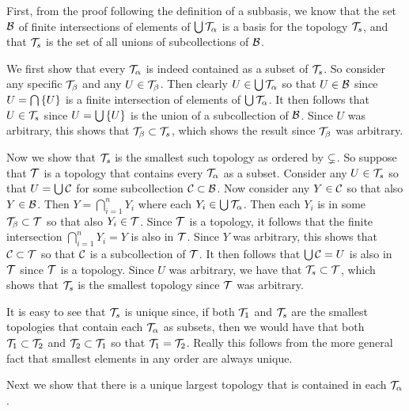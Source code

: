 {{    First, from the proof following the definition of a subbasis, we know that the set $\mathcal{B}$ of finite intersections of elements of $\bigcup \mathcal{T}_\alpha$ is a basis for the topology $\mathcal{T}_s$, and that $\mathcal{T}_s$ is the set of all unions of subcollections of $\mathcal{B}$.

    We first show that every $\mathcal{T}_\alpha$ is indeed contained as a subset of $\mathcal{T}_s$.
    So consider any specific $\mathcal{T}_\beta$ and any $U \in \mathcal{T}_\beta$.
    Then clearly $U \in \bigcup \mathcal{T}_\alpha$ so that $U \in \mathcal{B}$ since $U = \bigcap \left\{ U \right\}$ is a finite intersection of elements of $\bigcup \mathcal{T}_\alpha$.
    It then follows that $U \in \mathcal{T}_s$ since $U = \bigcup \left\{ U \right\}$ is the union of a subcollection of $\mathcal{B}$.
    Since $U$ was arbitrary, this shows that $\mathcal{T}_\beta \subset \mathcal{T}_s$, which shows the result since $\mathcal{T}_\beta$ was arbitrary.

    Now we show that $\mathcal{T}_s$ is the smallest such topology as ordered by $\subsetneq$.
    So suppose that $\mathcal{T}$ is a topology that contains every $\mathcal{T}_\alpha$ as a subset.
    Consider any $U \in \mathcal{T}_s$ so that $U = \bigcup \mathcal{C}$ for some subcollection $\mathcal{C} \subset \mathcal{B}$.
    Now consider any $Y \in \mathcal{C}$ so that also $Y \in \mathcal{B}$.
    Then $Y = \bigcap_{i=1}^n Y_i$ where each $Y_i \in \bigcup \mathcal{T}_\alpha$.
    Then each $Y_i$ is in some $\mathcal{T}_\beta \subset \mathcal{T}$ so that also $Y_i \in \mathcal{T}$.
    Since $\mathcal{T}$ is a topology, it follows that the finite intersection $\bigcap_{i=1}^n Y_i = Y$ is also in $\mathcal{T}$.
    Since $Y$ was arbitrary, this shows that $\mathcal{C} \subset \mathcal{T}$ so that $\mathcal{C}$ is a subcollection of $\mathcal{T}$.
    It then follows that $\bigcup \mathcal{C} = U$ is also in $\mathcal{T}$ since $\mathcal{T}$ is a topology.
    Since $U$ was arbitrary, we have that $\mathcal{T}_s \subset \mathcal{T}$, which shows that $\mathcal{T}_s$ is the smallest topology since $\mathcal{T}$ was arbitrary.

    It is easy to see that $\mathcal{T}_s$ is unique since, if both $\mathcal{T}_1$ and $\mathcal{T}_s$ are the smallest topologies that contain each $\mathcal{T}_\alpha$ as subsets, then we would have that both $\mathcal{T}_1 \subset \mathcal{T}_2$ and $\mathcal{T}_2 \subset \mathcal{T}_1$ so that $\mathcal{T}_1 = \mathcal{T}_2$.
    Really this follows from the more general fact that smallest elements in any order are always unique.
  }

  Next we show that there is a unique largest topology that is contained in each $\mathcal{T}_\alpha$.
  }
